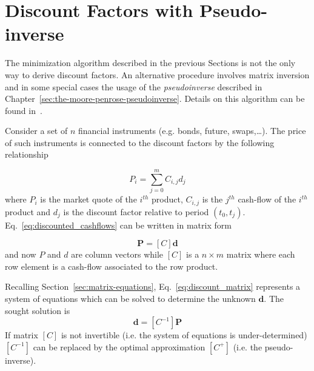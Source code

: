 \section{Discount Factors with Pseudo-inverse}
The minimization algorithm described in the previous Sections is not the only way to derive discount factors. An alternative procedure involves matrix inversion and in some special cases the usage of the \emph{pseudoinverse} described in Chapter~\ref{sec:the-moore-penrose-pseudoinverse}. Details on this algorithm can be found in~\cite{bib:boostrap_pseudoinv}.

Consider a set of $n$ financial instruments (e.g. bonds, future, swaps,\ldots). The price of such instruments is connected to the discount factors by the following relationship

\begin{equation}
P_i = \sum_{j=0}^{m} C_{i,j} d_j
\label{eq:discounted_cashflows}
\end{equation}
where $P_i$ is the market quote of the $i^{th}$ product, $C_{i,j}$ is the $j^{th}$ cash-flow of the $i^{th}$ product and $d_j$ is the discount factor relative to period $(t_0, t_j)$.
Eq.~\ref{eq:discounted_cashflows} can be written in matrix form

\begin{equation}
\boldsymbol{P} = [C]\boldsymbol{d}
\label{eq:discount_matrix}
\end{equation}
and now $P$ and $d$ are column vectors while $[C]$ is a $n \times m$ matrix where each row element is a cash-flow associated to the row product.

Recalling Section~\ref{sec:matrix-equations}, Eq.~\ref{eq:discount_matrix} represents a system of equations which can be solved to determine the unknown $\boldsymbol{d}$.
The sought solution is 
\begin{equation}
\boldsymbol{d} = [C^{-1}] \boldsymbol{P}
\end{equation} 
If matrix $[C]$ is not invertible (i.e. the system of equations is under-determined) $[C^{-1}]$ can be replaced by the optimal approximation $[C^+]$ (i.e. the pseudo-inverse). 

